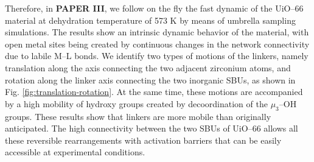\npar
Therefore, in \textbf{PAPER III}, we follow on the fly the fast dynamic of the UiO--66 material at dehydration temperature of 573 K by means of umbrella sampling simulations. The results show an intrinsic dynamic behavior of the material, with open metal sites being created by continuous changes in the network connectivity due to labile M--L bonds. We identify two types of motions of the linkers, namely translation along the axis connecting the two adjacent zirconium atoms, and rotation along the linker axis connecting the two inorganic SBUs, as shown in Fig. \ref{fig:translation-rotation}. At the same time, these motions are accompanied by a high mobility of hydroxy groups created by decoordination of the $\mu_3$--OH groups. These results show that linkers are more mobile than originally anticipated. The high connectivity between the two SBUs of UiO--66 allows all these reversible rearrangements with activation barriers that can be easily accessible at experimental conditions. 


